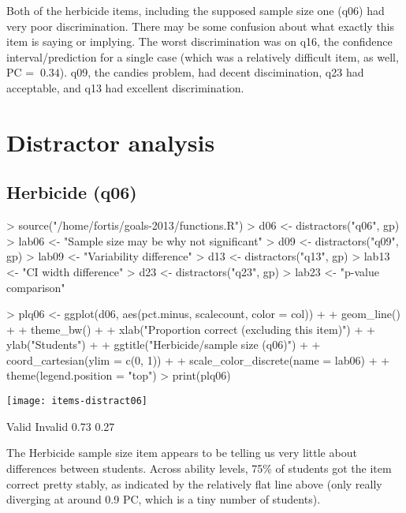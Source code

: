 \documentclass[11pt]{article}
\begin{document}
Both of the herbicide items, including the supposed sample size one (q06) had very poor discrimination.  There may be some confusion about what exactly this item is saying or implying. The worst discrimination was on q16, the confidence interval/prediction for a single case (which was a relatively difficult item, as well, PC = $~ 0.34$).  q09, the candies problem, had decent discimination, q23 had acceptable, and q13 had excellent discrimination.
\section{Distractor analysis}
\label{sec-2}

\subsection{Herbicide (q06)}
\label{sec-2-1}
\begin{Schunk}
\begin{Sinput}
> source("/home/fortis/goals-2013/functions.R")
> d06 <- distractors("q06", gp)
> lab06 <- "Sample size may be why not significant"
> d09 <- distractors("q09", gp)
> lab09 <- "Variability difference"
> d13 <- distractors("q13", gp)
> lab13 <- "CI width difference"
> d23 <- distractors("q23", gp)
> lab23 <- "p-value comparison"
\end{Sinput}
\end{Schunk}

\begin{Schunk}
\begin{Sinput}
> plq06 <- ggplot(d06, aes(pct.minus, scalecount, color = col)) +
+     geom_line() +
+     theme_bw() +
+     xlab("Proportion correct (excluding this item)") +
+     ylab("Students") +
+     ggtitle("Herbicide/sample size (q06)") +
+     coord_cartesian(ylim = c(0, 1)) + 
+     scale_color_discrete(name = lab06) +
+     theme(legend.position = "top")
> print(plq06)
\end{Sinput}
\end{Schunk}
\texttt{[image: items-distract06]}

\begin{Schunk}
\begin{Soutput}
  Valid Invalid 
   0.73    0.27 
\end{Soutput}
\end{Schunk}

The Herbicide sample size item appears to be telling us very little about differences between students.  Across ability levels, 75\% of students got the item correct pretty stably, as indicated by the relatively flat line above (only really diverging at around 0.9 PC, which is a tiny number of students).
\end{document}
